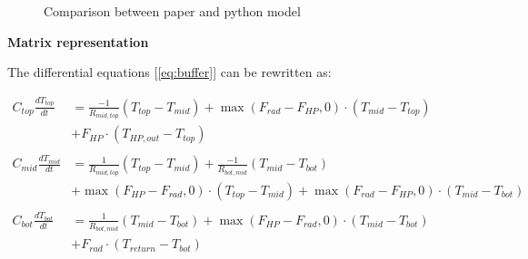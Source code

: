 \begin{figure}[H]
	\centering
	\qquad
	\caption{Comparison between paper and python model}
	\label{fig:Comparison}
\end{figure}

\textbf{Matrix representation}

The differential equations [\ref{eq:buffer}] can be rewritten as:

{\color{teal}
	\begin{equation}
		\begin{aligned}
			C_{top}\frac{dT_{top}}{dt} &= \frac{-1}{R_{mid, top}} (T_{top}-T_{mid}) + \max(F_{rad}-F_{HP}, 0) \cdot (T_{mid} - T_{top}) \\
			&+ F_{HP} \cdot (T_{HP,out} - T_{top})
			\\ \\
			C_{mid}\frac{dT_{mid}}{dt} &= \frac{1}{R_{mid, top}} (T_{top}-T_{mid}) + \frac{-1}{R_{bot, mid}}(T_{mid}-T_{bot}) \\
			& + \max(F_{HP}-F_{rad}, 0) \cdot (T_{top} - T_{mid}) + \max(F_{rad}-F_{HP}, 0)  \cdot (T_{mid} - T_{bot}) 
			\\ \\
			C_{bot}\frac{dT_{bot}}{dt} &= \frac{1}{R_{bot, mid}} (T_{mid}-T_{bot}) + \max(F_{HP} - F_{rad}, 0) \cdot (T_{mid} - T_{bot})\\
			& + F_{rad} \cdot (T_{return} - T_{bot}) 
		\end{aligned}
	\end{equation}
}

